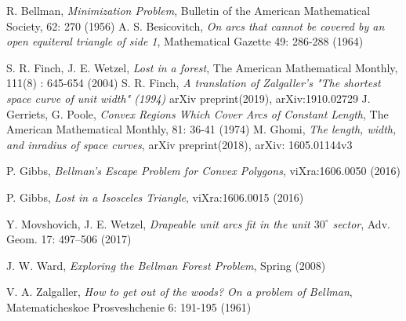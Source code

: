 \documentclass[11pt,letter]{article}
\begin{document}
\begin{thebibliography}{99}


	R. Bellman,
	\textit{Minimization Problem},
	Bulletin of the American Mathematical Society, 62: 270  (1956)
	A. S. Besicovitch,
	\textit{On arcs that cannot be covered by an open equiteral triangle of side 1},
	Mathematical Gazette 49: 286-288 (1964)

	S. R. Finch, J. E. Wetzel,
	\textit{Lost in a forest},
	The American Mathematical Monthly, 111(8) : 645-654 (2004)
	S. R. Finch,
	\textit{A translation of Zalgaller's "The shortest space curve of unit width" (1994)}
	arXiv preprint(2019), arXiv:1910.02729
	J. Gerriets, G. Poole,
	\textit{Convex Regions Which Cover Arcs of Constant Length},
	The American Mathematical Monthly, 81: 36-41 (1974)
 	M. Ghomi,
	\textit{The length, width, and inradius of space curves},
	arXiv preprint(2018), arXiv: 1605.01144v3



	P. Gibbs, 
	\textit{Bellman’s Escape Problem for Convex Polygons},
	viXra:1606.0050 (2016)

	P. Gibbs,
	\textit{Lost in a Isosceles Triangle},
	viXra:1606.0015 (2016)

	Y. Movshovich, J. E. Wetzel,
	\textit{Drapeable unit arcs fit in the unit $30^\circ$ sector},
	 Adv. Geom. 17: 497–506 (2017)

    J. W. Ward,
    \textit{Exploring the Bellman Forest Problem},
    Spring (2008)

	V. A. Zalgaller,
	\textit{How to get out of the woods? On a problem of Bellman},
	Matematicheskoe Prosveshchenie 6: 191-195 (1961)


\end{thebibliography}
\end{document}
